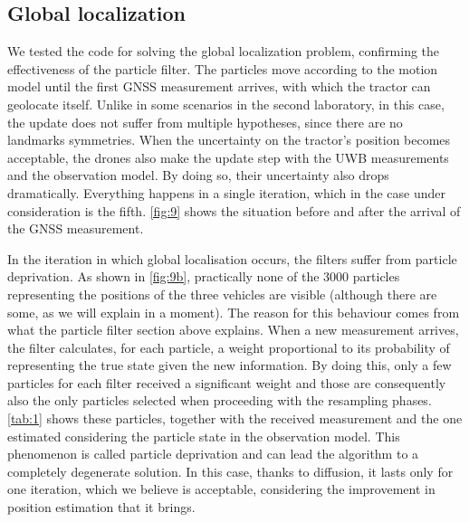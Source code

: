 \documentclass[letterpaper,twocolumn,10pt]{article}
\begin{document}
\subsection*{Global localization}
We tested the code for solving the global localization problem, confirming the effectiveness of the particle filter. The particles move according to the motion model until the first GNSS measurement arrives, with which the tractor can geolocate itself. Unlike in some scenarios in the second laboratory, in this case, the update does not suffer from multiple hypotheses, since there are no landmarks symmetries. When the uncertainty on the tractor's position becomes acceptable, the drones also make the update step with the UWB measurements and the observation model. By doing so, their uncertainty also drops dramatically. Everything happens in a single iteration, which in the case under consideration is the fifth. \autoref{fig:9} shows the situation before and after the arrival of the GNSS measurement.

In the iteration in which global localisation occurs, the filters suffer from particle deprivation. As shown in \autoref{fig:9b}, practically none of the 3000 particles representing the positions of the three vehicles are visible (although there are some, as we will explain in a moment). 
The reason for this behaviour comes from what the particle filter section above explains. When a new measurement arrives, the filter calculates, for each particle, a weight proportional to its probability of representing the true state given the new information. 
By doing this, only a few particles for each filter received a significant weight and those are consequently also the only particles selected when proceeding with the resampling phases. \autoref{tab:1} shows these particles, together with the received measurement and the one estimated considering the particle state in the observation model. 
This phenomenon is called particle deprivation and can lead the algorithm to a completely degenerate solution. In this case, thanks to diffusion, it lasts only for one iteration, which we believe is acceptable, considering the improvement in position estimation that it brings. 

\end{document}
